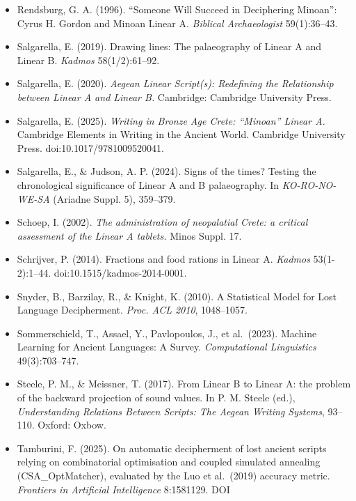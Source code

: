 \documentclass[
  10pt,
]{article}
\begin{document}
\begin{itemize}
  Optimally with Low-Order N-gram Models. \emph{Proc. EMNLP 2008},
  812--819. (Cited in §8.3: decipherment accuracy vs.~ciphertext length
  --- a data-size recovery curve.)
\item
  Rendsburg, G. A. (1996). ``Someone Will Succeed in Deciphering
  Minoan'': Cyrus H. Gordon and Minoan Linear A. \emph{Biblical
  Archaeologist} 59(1):36--43.
\item
  Salgarella, E. (2019). Drawing lines: The palaeography of Linear A and
  Linear B. \emph{Kadmos} 58(1/2):61--92.
\item
  Salgarella, E. (2020). \emph{Aegean Linear Script(s): Redefining the
  Relationship between Linear A and Linear B.} Cambridge: Cambridge
  University Press.
\item
  Salgarella, E. (2025). \emph{Writing in Bronze Age Crete: ``Minoan''
  Linear A.} Cambridge Elements in Writing in the Ancient World.
  Cambridge University Press. doi:10.1017/9781009520041.
\item
  Salgarella, E., \& Judson, A. P. (2024). Signs of the times? Testing
  the chronological significance of Linear A and B palaeography. In
  \emph{KO-RO-NO-WE-SA} (Ariadne Suppl. 5), 359--379.
\item
  Schoep, I. (2002). \emph{The administration of neopalatial Crete: a
  critical assessment of the Linear A tablets.} Minos Suppl. 17.
\item
  Schrijver, P. (2014). Fractions and food rations in Linear A.
  \emph{Kadmos} 53(1-2):1--44. doi:10.1515/kadmos-2014-0001.
\item
  Snyder, B., Barzilay, R., \& Knight, K. (2010). A Statistical Model
  for Lost Language Decipherment. \emph{Proc. ACL 2010}, 1048--1057.
\item
  Sommerschield, T., Assael, Y., Pavlopoulos, J., et al.~(2023). Machine
  Learning for Ancient Languages: A Survey. \emph{Computational
  Linguistics} 49(3):703--747.
\item
  Steele, P. M., \& Meissner, T. (2017). From Linear B to Linear A: the
  problem of the backward projection of sound values. In P. M. Steele
  (ed.), \emph{Understanding Relations Between Scripts: The Aegean
  Writing Systems}, 93--110. Oxford: Oxbow.
\item
  Tamburini, F. (2025). On automatic decipherment of lost ancient
  scripts relying on combinatorial optimisation and coupled simulated
  annealing (CSA\_OptMatcher), evaluated by the Luo et al.~(2019)
  accuracy metric. \emph{Frontiers in Artificial Intelligence}
  8:1581129. DOI

\end{itemize}
\end{document}
